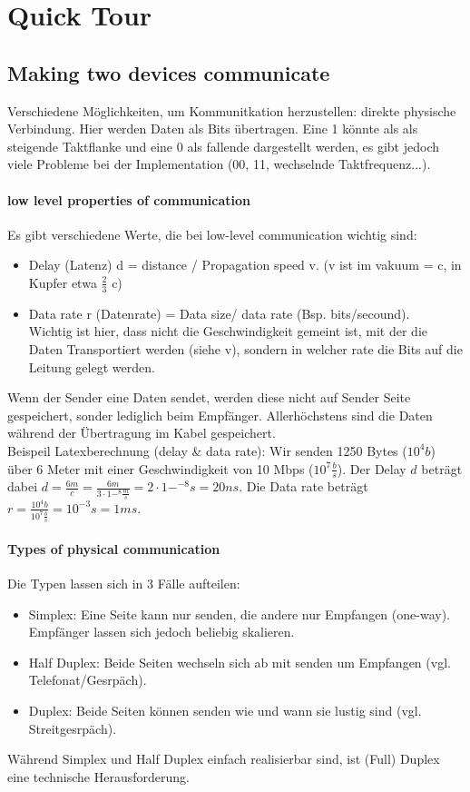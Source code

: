 \section{Quick Tour}
\subsection{Making two devices communicate}
    Verschiedene Möglichkeiten, um Kommunitkation herzustellen: direkte physische Verbindung. Hier werden Daten als Bits übertragen. Eine 1 könnte als als steigende Taktflanke und eine 0 als fallende dargestellt werden, es gibt jedoch viele Probleme bei der Implementation (00, 11, wechselnde Taktfrequenz...).
    \paragraph{low level properties of communication}
        Es gibt verschiedene Werte, die bei low-level communication wichtig sind: 
        \begin{itemize}
            \item Delay (Latenz) d = distance / Propagation speed v. (v ist im vakuum = c, in Kupfer etwa $\frac{2}{3}$ c)
            \item Data rate r (Datenrate) = Data size/ data rate (Bsp. bits/secound). \\ Wichtig ist hier, dass nicht die Geschwindigkeit gemeint ist, mit der die Daten Transportiert werden (siehe v), sondern in welcher rate die Bits auf die Leitung gelegt werden.
        \end{itemize}
        
        Wenn der Sender eine Daten sendet, werden diese nicht auf Sender Seite gespeichert, sonder lediglich beim Empfänger. Allerhöchstens sind die Daten während der Übertragung im Kabel gespeichert. \\
        Beispeil Latexberechnung (delay \& data rate): Wir senden 1250 Bytes ($10^4b$) über 6 Meter mit einer Geschwindigkeit von 10 Mbps ($10^7 \frac{b}{s}$). Der Delay $d$ beträgt dabei $d = \frac{6m}{c} = \frac{6m}{3\cdot 1-^8\frac{m}{s}} = 2\cdot1-^{-8}s = 20ns$. Die Data rate beträgt $r= \frac{10^4b}{10^7\frac{b}{s}} = 10^{-3}s = 1ms$. 
    \paragraph{Types of physical communication}
        Die Typen lassen sich in 3 Fälle aufteilen:
        \begin{itemize}
            \item Simplex: Eine Seite kann nur senden, die andere nur Empfangen (one-way). Empfänger lassen sich jedoch beliebig skalieren.
            \item Half Duplex: Beide Seiten wechseln sich ab mit senden um Empfangen (vgl. Telefonat/Gesrpäch).
            \item Duplex: Beide Seiten können senden wie und wann sie lustig sind (vgl. Streitgesrpäch).
        \end{itemize}
        Während Simplex und Half Duplex einfach realisierbar sind, ist (Full) Duplex eine technische Herausforderung. 
